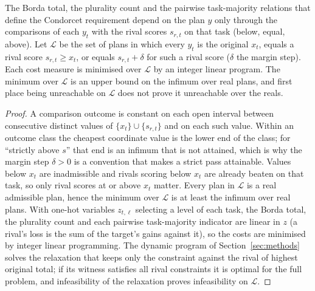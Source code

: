 \begin{proposition}\label{prop:levels}
The Borda total, the plurality count and the pairwise task-majority relations that define the Condorcet requirement depend on the plan $y$ only through the comparisons of each $y_t$ with the rival scores $s_{r,t}$ on that task (below, equal, above). Let $\mathcal L$ be the set of plans in which every $y_t$ is the original $x_t$, equals a rival score $s_{r,t}\ge x_t$, or equals $s_{r,t}+\delta$ for such a rival score ($\delta$ the margin step). Each cost measure is minimised over $\mathcal L$ by an integer linear program. The minimum over $\mathcal L$ is an upper bound on the infimum over real plans, and first place being unreachable on $\mathcal L$ does not prove it unreachable over the reals.
\end{proposition}
\begin{proof}
A comparison outcome is constant on each open interval between consecutive distinct values of $\{x_t\}\cup\{s_{r,t}\}$ and on each such value. Within an outcome class the cheapest coordinate value is the lower end of the class; for ``strictly above $s$'' that end is an infimum that is not attained, which is why the margin step $\delta>0$ is a convention that makes a strict pass attainable. Values below $x_t$ are inadmissible and rivals scoring below $x_t$ are already beaten on that task, so only rival scores at or above $x_t$ matter. Every plan in $\mathcal L$ is a real admissible plan, hence the minimum over $\mathcal L$ is at least the infimum over real plans. With one-hot variables $z_{t,\ell}$ selecting a level of each task, the Borda total, the plurality count and each pairwise task-majority indicator are linear in $z$ (a rival's loss is the sum of the target's gains against it), so the costs are minimised by integer linear programming. The dynamic program of Section~\ref{sec:methods} solves the relaxation that keeps only the constraint against the rival of highest original total; if its witness satisfies all rival constraints it is optimal for the full problem, and infeasibility of the relaxation proves infeasibility on $\mathcal L$.
\end{proof}

